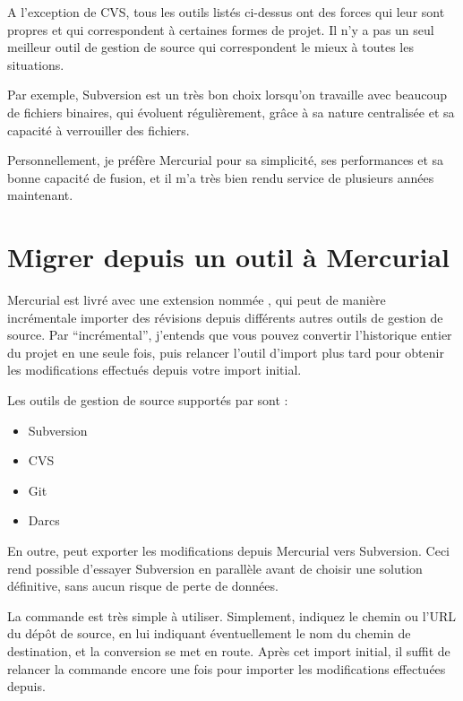 A l'exception de CVS, tous les outils listés ci-dessus ont des 
forces qui leur sont propres et qui correspondent à certaines
formes de projet. Il n'y a pas un seul meilleur outil de gestion
de source qui correspondent le mieux à toutes les situations.

Par exemple, Subversion est un très bon choix lorsqu'on travaille
avec beaucoup de fichiers binaires, qui évoluent régulièrement, grâce
à sa nature centralisée et sa capacité à verrouiller des fichiers.

Personnellement, je préfère Mercurial pour sa simplicité, ses 
performances et sa bonne capacité de fusion, et il m'a très bien rendu service
de plusieurs années maintenant.

\section{Migrer depuis un outil à Mercurial}

Mercurial est livré avec une extension nommée , qui
peut de manière incrémentale importer des révisions depuis différents
autres outils de gestion de source. Par ``incrémental'', j'entends que
vous pouvez convertir l'historique entier du projet en une seule fois,
puis relancer l'outil d'import plus tard pour obtenir les modifications
effectués depuis votre import initial.

Les outils de gestion de source supportés par  sont :
\begin{itemize}
	\item Subversion
	\item CVS
	\item Git
	\item Darcs
\end{itemize}

En outre,  peut exporter les modifications depuis Mercurial
vers Subversion. Ceci rend possible d'essayer Subversion en parallèle 
avant de choisir une solution définitive, sans aucun risque de perte de
données.

La commande  est très simple à utiliser. Simplement,
indiquez le chemin ou l'URL du dépôt de source, en lui indiquant éventuellement
le nom du chemin de destination, et la conversion se met en route. Après cet
import initial, il suffit de relancer la commande encore une fois pour 
importer les modifications effectuées depuis.

